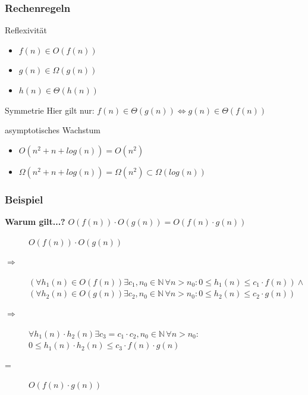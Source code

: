 \begin{frame}
			\frametitle{Rechenregeln}
			\begin{block}{Reflexivität}
                \begin{itemize}
                    \item $f(n) \in O(f(n))$
                    \item $g(n) \in \Omega(g(n))$
					\item $h(n) \in \Theta(h(n))$
                \end{itemize}
			\end{block}
			\begin{block}{Symmetrie}
					Hier gilt nur:  $f(n) \in \Theta(g(n)) \Leftrightarrow g(n) \in \Theta(f(n))$
			\end{block}
			\begin{block}{asymptotisches Wachstum}
				\begin{itemize}
                    \item $O(n^2 + n + log(n)) = O(n^2)$
                    \item $\Omega(n^2 + n + log(n)) = \Omega(n^2) \subset \Omega(log(n))$
                \end{itemize}
			\end{block}
\end{frame}

\begin{frame}
			\frametitle{Beispiel}
		\begin{block}{\bf Warum gilt...?}
		$O(f(n)) \cdot O(g(n)) = O(f(n) \cdot g(n)) $
		\end{block}
		\begin{description}
			\item[] 			$O(f(n)) \cdot O(g(n))$
			\scriptsize
			\item[$\Rightarrow$] $(\forall h_1(n) \in O(f(n)) \exists c_1, n_0 \in \mathbb{N} \,\forall n > n_0 : 0 \leq h_1(n) \leq c_1 \cdot f(n) ) \wedge $\\
								$(\forall h_2(n) \in O(g(n)) \exists c_2, n_0 \in \mathbb{N} \,\forall n > n_0 : 0 \leq h_2(n) \leq c_2 \cdot g(n) )$
			\normalsize
			\item[$\Rightarrow$] $\forall h_1(n)\cdot h_2(n)  \exists c_3 = c_1 \cdot c_2, n_0 \in \mathbb{N} \,\forall n > n_0 :$\\
								 $ 0 \leq h_1(n) \cdot h_2(n) \leq c_3 \cdot f(n) \cdot g(n)$
			\item[=]			$O(f(n) \cdot g(n))$
		\end{description}
\end{frame}

